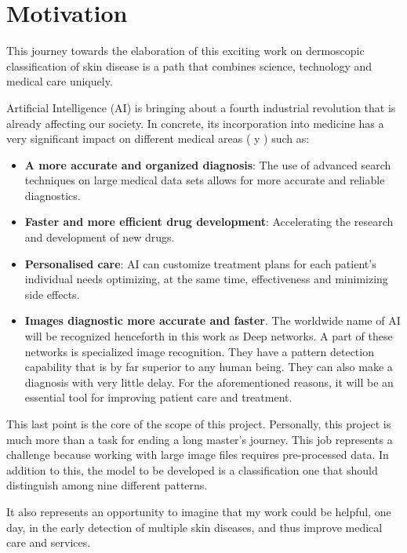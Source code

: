 \section{Motivation}

This journey towards the elaboration of this exciting work on dermoscopic classification of skin disease is a path that combines science, technology and medical care uniquely. 

Artificial Intelligence (AI) is bringing about a fourth industrial revolution that is already affecting our society. In concrete, its incorporation into medicine has a very significant impact on different medical areas (\cite{luciaclemares_que_2023} y \cite{apd_aplicaciones_IA_Medicina}) such as:

\begin{itemize}
    \item \textbf{A more accurate and organized diagnosis}: The use of advanced search techniques on large medical data sets allows for more accurate and reliable diagnostics. 
    \item \textbf{Faster and more efficient drug development}: Accelerating the research and development of new drugs.
    \item \textbf{Personalised care}: AI can customize treatment plans for each patient's individual needs optimizing, at the same time, effectiveness and minimizing side effects.
    \item \textbf{Images diagnostic more accurate and faster}. The worldwide name of AI will be recognized henceforth in this work as Deep networks. A part of these networks is specialized image recognition. They have a pattern detection capability that is by far superior to any human being. They can also make a diagnosis with very little delay. For the aforementioned reasons, it will be an essential tool for improving patient care and treatment. 
\end{itemize}

This last point is the core of the scope of this project. Personally, this project is much more than a task for ending a long master's journey. This job represents a challenge because working with large image files requires pre-processed data. In addition to this, the model to be developed is a classification one that should distinguish among nine different patterns.

It also represents an opportunity to imagine that my work could be helpful, one day, in the early detection of multiple skin diseases, and thus improve medical care and services.



